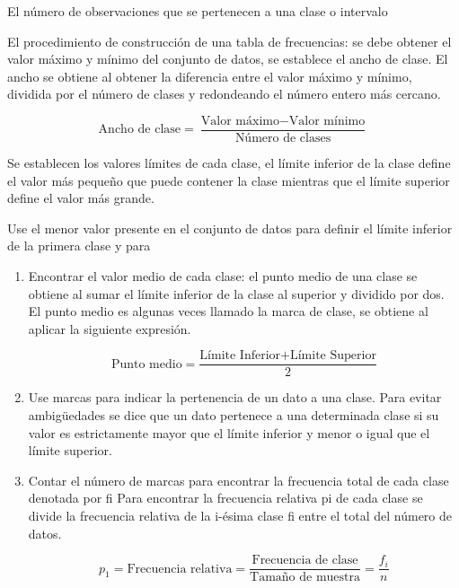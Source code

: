 \begin{definition}[Frecuencia]
    El número de observaciones que se pertenecen a una clase o intervalo
\end{definition}

El procedimiento de construcción de una tabla de frecuencias: se debe obtener el valor máximo y mínimo del conjunto de datos, se establece el ancho de clase. El ancho se obtiene al obtener la diferencia entre el valor máximo y mínimo, dividida por el número de clases y redondeando el número entero más cercano.

\begin{equation}
    \text{Ancho de clase}=\frac{\text{Valor máximo}-\text{Valor mínimo}}{\text{Número de clases}}
\end{equation}

Se establecen los valores límites de cada clase, el límite inferior de la clase define el valor más pequeño que puede contener la clase mientras que el límite superior define el valor más grande.

Use el menor valor presente en el conjunto de datos para definir el límite inferior de la primera clase y para


\begin{enumerate}
    \item Encontrar el valor medio de cada clase: el
          punto medio de una clase se obtiene al
          sumar el límite inferior de la clase al
          superior y dividido por dos. El punto
          medio es algunas veces llamado la marca
          de clase, se obtiene al aplicar la siguiente
          expresión.

          \begin{equation}
              \text{Punto medio}=\frac{\text{Límite Inferior+Límite Superior}}{2}
          \end{equation}

    \item Use marcas para indicar la pertenencia de un
          dato a una clase. Para evitar ambigüedades se
          dice que un dato pertenece a una determinada
          clase si su valor es estrictamente mayor que
          el límite inferior y menor o igual que el límite
          superior.

    \item Contar el número de marcas para encontrar la
          frecuencia total de cada clase denotada por fi
          Para encontrar la frecuencia relativa pi de
          cada clase se divide la frecuencia relativa de
          la i-ésima clase fi entre el total del número de
          datos.

          \begin{equation}
              p_1=\text{Frecuencia relativa}=\frac{\text{Frecuencia de clase}}{\text{Tamaño de muestra}}=\frac{f_i}{n}
          \end{equation}

\end{enumerate}


